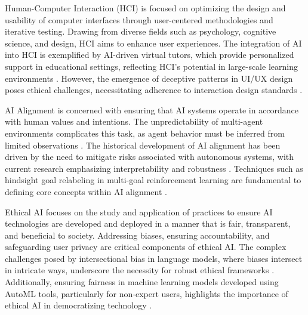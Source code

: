 Human-Computer Interaction (HCI) is focused on optimizing the design and usability of computer interfaces through user-centered methodologies and iterative testing. Drawing from diverse fields such as psychology, cognitive science, and design, HCI aims to enhance user experiences. The integration of AI into HCI is exemplified by AI-driven virtual tutors, which provide personalized support in educational settings, reflecting HCI's potential in large-scale learning environments \cite{thapliyal2022crossmodal3600massivelymultilingualmultimodal}. However, the emergence of deceptive patterns in UI/UX design poses ethical challenges, necessitating adherence to interaction design standards \cite{benharrak2024deceptivepatternsintelligentinteractive}.



AI Alignment is concerned with ensuring that AI systems operate in accordance with human values and intentions. The unpredictability of multi-agent environments complicates this task, as agent behavior must be inferred from limited observations \cite{waugh2011computationalrationalizationinverseequilibrium}. The historical development of AI alignment has been driven by the need to mitigate risks associated with autonomous systems, with current research emphasizing interpretability and robustness \cite{jucys2024interpretabilityactionexploratoryanalysis}. Techniques such as hindsight goal relabeling in multi-goal reinforcement learning are fundamental to defining core concepts within AI alignment \cite{zhang2023understandinghindsightgoalrelabeling}.



Ethical AI focuses on the study and application of practices to ensure AI technologies are developed and deployed in a manner that is fair, transparent, and beneficial to society. Addressing biases, ensuring accountability, and safeguarding user privacy are critical components of ethical AI. The complex challenges posed by intersectional bias in language models, where biases intersect in intricate ways, underscore the necessity for robust ethical frameworks \cite{magee2021intersectionalbiascausallanguage}. Additionally, ensuring fairness in machine learning models developed using AutoML tools, particularly for non-expert users, highlights the importance of ethical AI in democratizing technology \cite{narayanan2023democratizecareneedfairness}.



